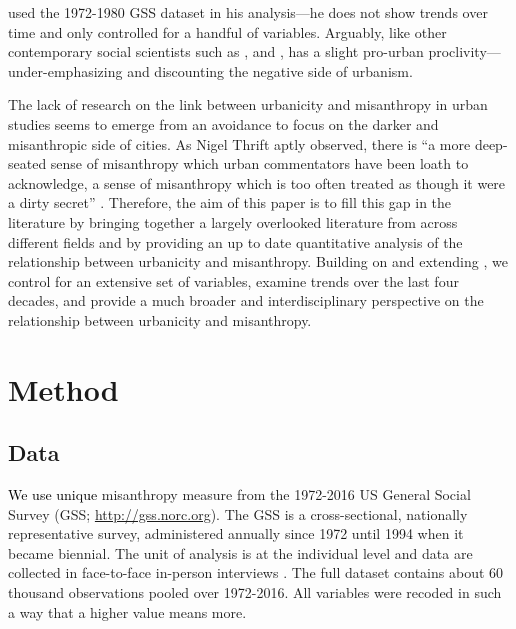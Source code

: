 \documentclass[11pt, letterpaper]{article}
\newcommand{\hilite}[1]{\textcolor{black}{#1}}
\begin{document}
\begin{spacing}{1.4}
\citet{wilson85} used the 1972-1980 GSS dataset in his analysis---he does not show trends over time and only controlled for a handful of variables.  Arguably, like other
contemporary social scientists such as \citet[][]{veenhoven94}, \citet[][]{meyer13} and \citet[][]{fischer82}, \citeauthor{wilson85} has a slight pro-urban
proclivity---under-emphasizing and discounting the negative side of urbanism.  

The lack of research on the link between urbanicity and misanthropy in urban studies
seems to emerge from an avoidance to focus on the darker and misanthropic side
of cities. As Nigel Thrift aptly observed, there is ``a more deep-seated sense of misanthropy which urban commentators have been loath to acknowledge, a sense of misanthropy which is too often treated as though it were a dirty secret'' \citep[p. 134]{thrift05}. Therefore, the aim of this paper is to fill this gap in the literature by
bringing together a largely overlooked literature from across different fields and
by providing an up to date quantitative analysis of the relationship between
urbanicity and misanthropy. Building on and extending \citet{wilson85}, we control for an extensive set of variables, examine trends over the last four decades, and provide a much broader and interdisciplinary perspective on the relationship between urbanicity and misanthropy. 



\section*{Method} 

\subsection*{Data}

\hilite{We use unique} misanthropy measure from the 1972-2016 US General Social Survey (GSS;
\url{http://gss.norc.org}). The GSS is a cross-sectional, nationally
representative survey, administered annually since 1972 until 1994 when it
became biennial. The unit of analysis is at the individual level and data are collected in face-to-face in-person interviews \citep{davis07}. The full dataset contains about 60 thousand observations pooled over 1972-2016. All variables were recoded in such a way that a higher value means more. 


\end{spacing}
\end{document}
